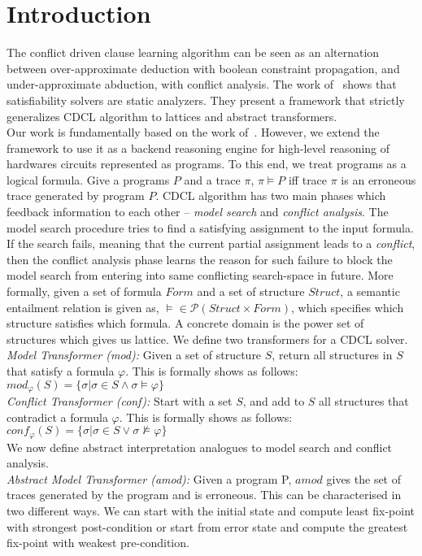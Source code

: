 \section{Introduction}\label{introduction}
%
The conflict driven clause learning algorithm can be seen as an 
alternation between over-approximate deduction with boolean 
constraint propagation, and under-approximate abduction, with 
conflict analysis. The work of~\cite{dhk2013-popl,sas12,tacas12} 
shows that satisfiability solvers are static analyzers. They present 
a framework that strictly generalizes CDCL algorithm to lattices and 
abstract transformers. \\
Our work is fundamentally based on the work of~\cite{dhk2013-popl}. 
However, we extend the framework to use it as a backend reasoning 
engine for high-level reasoning of hardwares circuits represented as programs.
To this end, we treat programs as a logical formula. Give a programs $P$ and a trace $\pi$,
$\pi \models P$ iff trace $\pi$ is an erroneous trace generated by program
$P$. CDCL algorithm has two main phases which feedback information to each other --
{\em model search} and {\em conflict analysis}. The model search procedure tries to find a 
satisfying assignment to the input formula. If the search fails, meaning that the current 
partial assignment leads to a {\em conflict}, then the conflict analysis phase learns the 
reason for such failure to block the model search from entering into same conflicting 
search-space in future. More formally, given a set of formula $Form$ and a set of 
structure $Struct$, a semantic entailment relation is given as, $\models \in \mathcal{P}(Struct
\times Form)$, which specifies which structure satisfies which formula. A 
concrete domain is the power set of structures which gives us lattice. 
We define two transformers for a CDCL solver. \\
\textit{Model Transformer (mod):} Given a set of structure $S$, return all structures 
in $S$ that satisfy a formula $\varphi$. This is formally shows as follows:
$mod_{\varphi}(S) = \{\sigma | \sigma \in S \wedge \sigma \models \varphi\}$ \\

\textit{Conflict Transformer (conf):} Start with a set $S$, and add to $S$ all structures 
that contradict a formula $\varphi$. This is formally shows as follows:
$conf_{\varphi}(S) = \{\sigma | \sigma \in S \vee \sigma \not\models \varphi\}$
\\
We now define abstract interpretation analogues to model search and conflict analysis.   \\
\textit{Abstract Model Transformer (amod):} Given a program P, $amod$ gives the 
set of traces generated by the program and is erroneous. This can be
characterised in two different ways. We can start with the initial state and
compute least fix-point with strongest post-condition or start from error state 
and compute the greatest fix-point with weakest pre-condition. \\


